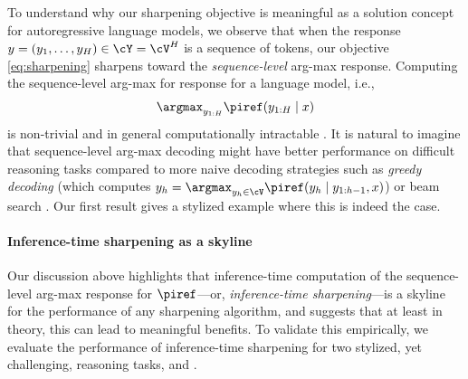 



  












To understand why our sharpening objective is meaningful as a solution
concept for autoregressive language models, we observe
that when the response
$y=(y_1,\ldots,y_H)\in\cY=\cV^{H}$ is a sequence of tokens, our objective
\cref{eq:sharpening} sharpens
toward the \emph{sequence-level} arg-max response. Computing the
sequence-level arg-max for response for a language model, i.e.,
\begin{align}
  \label{eq:inference_time}
\argmax_{y_{1:H}}\piref(y_{1:H}\mid{}x)
\end{align}
is non-trivial and in general computationally intractable
. It is natural to imagine that sequence-level arg-max decoding might have
better performance on difficult reasoning tasks compared to more naive
decoding strategies such as \emph{greedy decoding} (which computes
$y_h=\argmax_{y_h\in\cV}\piref(y_h\mid{}y_{1:h-1},x)$) or beam search
. Our first result gives a stylized example where this is
indeed the case.
    \begin{example}
      \label{ex:greedy}
    \end{example}

    \paragraph{Inference-time sharpening as a skyline}
Our discussion above highlights that inference-time computation
of the sequence-level arg-max response for $\piref$---or,
\emph{inference-time sharpening}---is a skyline for
the performance of any sharpening algorithm, and suggests that at
least in theory, this can lead to meaningful benefits. To validate
this empirically, we evaluate the performance of inference-time
sharpening for two stylized, yet challenging, reasoning tasks, \gametwentyfour \citep{yao2024tree} and
\stargraph \citep{bachmann2024pitfalls}.

